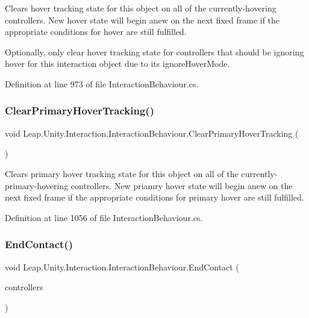 Clears hover tracking state for this object on all of the currently-\/hovering controllers. New hover state will begin anew on the next fixed frame if the appropriate conditions for hover are still fulfilled. 

Optionally, only clear hover tracking state for controllers that should be ignoring hover for this interaction object due to its ignore\+Hover\+Mode. 

Definition at line 973 of file Interaction\+Behaviour.\+cs.

\mbox{\label{class_leap_1_1_unity_1_1_interaction_1_1_interaction_behaviour_a94d561f0f50a5a0adbf630fad5d599f2}} 
\subsubsection{\texorpdfstring{ClearPrimaryHoverTracking()}{ClearPrimaryHoverTracking()}}
{\footnotesize\ttfamily void Leap.\+Unity.\+Interaction.\+Interaction\+Behaviour.\+Clear\+Primary\+Hover\+Tracking (\begin{DoxyParamCaption}{ }\end{DoxyParamCaption})}



Clears primary hover tracking state for this object on all of the currently-\/ primary-\/hovering controllers. New priamry hover state will begin anew on the next fixed frame if the appropriate conditions for primary hover are still fulfilled. 



Definition at line 1056 of file Interaction\+Behaviour.\+cs.

\mbox{\label{class_leap_1_1_unity_1_1_interaction_1_1_interaction_behaviour_ac75f580c1e1e3136fab5f7cc5764c84d}} 
\subsubsection{\texorpdfstring{EndContact()}{EndContact()}}
{\footnotesize\ttfamily void Leap.\+Unity.\+Interaction.\+Interaction\+Behaviour.\+End\+Contact (\begin{DoxyParamCaption}\item[{List$<$ \mbox{\hyperlink{class_leap_1_1_unity_1_1_interaction_1_1_interaction_controller}{Interaction\+Controller}} $>$}]{controllers }\end{DoxyParamCaption})}



